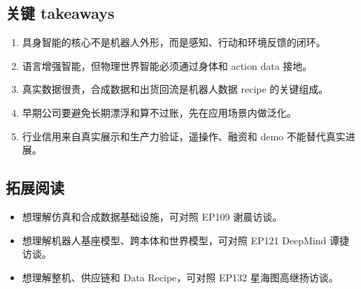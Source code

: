 \documentclass[a4paper]{article}
\begin{document}
\subsection{关键 takeaways}

\begin{enumerate}
\item 具身智能的核心不是机器人外形，而是感知、行动和环境反馈的闭环。
\item 语言增强智能，但物理世界智能必须通过身体和 action data 接地。
\item 真实数据很贵，合成数据和出货回流是机器人数据 recipe 的关键组成。
\item 早期公司要避免长期漂浮和算不过账，先在应用场景内做泛化。
\item 行业信用来自真实展示和生产力验证，遥操作、融资和 demo 不能替代真实进展。
\end{enumerate}

\subsection{拓展阅读}

\begin{itemize}
\item 想理解仿真和合成数据基础设施，可对照 EP109 谢晨访谈。
\item 想理解机器人基座模型、跨本体和世界模型，可对照 EP121 DeepMind 谭捷访谈。
\item 想理解整机、供应链和 Data Recipe，可对照 EP132 星海图高继扬访谈。
\end{itemize}
\end{document}
